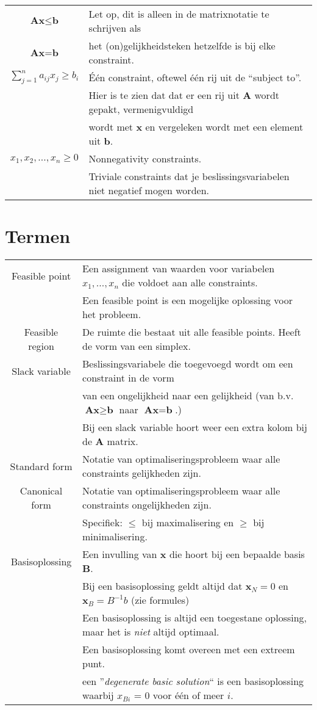 \documentclass[10pt,a4paper]{article}
\begin{document}
\begin{tabular}{|c|l|}
$\textbf{Ax} \leq \textbf{b}$ & Let op, dit is alleen in de matrixnotatie te schrijven als \\
$\textbf{Ax} = \textbf{b}$ & het (on)gelijkheidsteken hetzelfde is bij elke constraint.\\
\hline
$\displaystyle\sum\limits_{j=1}^n a_{ij}x_j \ge b_i$ & Één constraint, oftewel één rij uit de ``subject to''.\\
 & Hier is te zien dat dat er een rij uit $\textbf{A}$ wordt gepakt, vermenigvuldigd \\ &  wordt met $\textbf{x}$ en vergeleken wordt met een element uit $\textbf{b}$. \\
\hline
$x_1, x_2, ..., x_n \geq 0$ & Nonnegativity constraints. \\ & Triviale constraints dat je beslissingsvariabelen niet negatief mogen worden.\\
\hline
\end{tabular}

\newpage
\section*{Termen}
\begin{tabular}{|c|l|}
\hline
Feasible point & Een assignment van waarden voor variabelen $x_1, ..., x_n$ die voldoet aan alle constraints. \\ 
& Een feasible point is een mogelijke oplossing voor het probleem.\\
\hline
Feasible region & De ruimte die bestaat uit alle feasible points. Heeft de vorm van een simplex. \\
\hline
Slack variable & Beslissingsvariabele die toegevoegd wordt om een constraint in de vorm \\ &van een ongelijkheid naar een gelijkheid (van b.v. $\textbf{Ax} \geq \textbf{b}$ naar $\textbf{Ax} = \textbf{b}$.)\\
& Bij een slack variable hoort weer een extra kolom bij de $\textbf{A}$ matrix. \\
\hline
Standard form & Notatie van optimaliseringsprobleem waar alle constraints gelijkheden zijn.\\
\hline
Canonical form & Notatie van optimaliseringsprobleem waar alle constraints ongelijkheden zijn.\\
 & Specifiek: $\le$ bij maximalisering en $\geq$ bij minimalisering. \\
\hline
Basisoplossing & Een invulling van $\textbf{x}$ die hoort bij een bepaalde basis $\textbf{B}$. \\
 & Bij een basisoplossing geldt altijd dat $\textbf{x}_N = 0$ en $\textbf{x}_B = B^{-1}b$ (zie formules) \\
 & Een basisoplossing is altijd een toegestane oplossing, maar het is \textit{niet} altijd optimaal. \\
 & Een basisoplossing komt overeen met een extreem punt. \\
 & een ''\textit{degenerate basic solution}`` is een basisoplossing waarbij $x_{Bi}$ = 0 voor één of meer $i$. \\
\hline
\end{tabular} 
\end{document}

